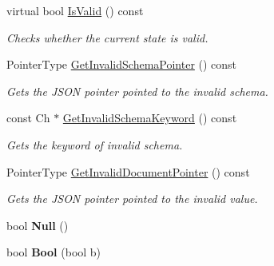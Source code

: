 \begin{DoxyCompactItemize}
virtual bool \hyperlink{classGenericSchemaValidator_a8ebda4da3d8b1fc41e57f15dd62e8f19}{Is\+Valid} () const
\begin{DoxyCompactList}\small\item\em Checks whether the current state is valid. \end{DoxyCompactList}\item 
\mbox{\label{classGenericSchemaValidator_a5b8f2d5c466b2a362e2e4c3bcfbfc5a8}} 
Pointer\+Type \hyperlink{classGenericSchemaValidator_a5b8f2d5c466b2a362e2e4c3bcfbfc5a8}{Get\+Invalid\+Schema\+Pointer} () const
\begin{DoxyCompactList}\small\item\em Gets the J\+S\+ON pointer pointed to the invalid schema. \end{DoxyCompactList}\item 
\mbox{\label{classGenericSchemaValidator_ab71ec18e5a013e5153a10b312a4f03bc}} 
const Ch $\ast$ \hyperlink{classGenericSchemaValidator_ab71ec18e5a013e5153a10b312a4f03bc}{Get\+Invalid\+Schema\+Keyword} () const
\begin{DoxyCompactList}\small\item\em Gets the keyword of invalid schema. \end{DoxyCompactList}\item 
\mbox{\label{classGenericSchemaValidator_ac10a88c4dc138bbdbe2afd041658a3b0}} 
Pointer\+Type \hyperlink{classGenericSchemaValidator_ac10a88c4dc138bbdbe2afd041658a3b0}{Get\+Invalid\+Document\+Pointer} () const
\begin{DoxyCompactList}\small\item\em Gets the J\+S\+ON pointer pointed to the invalid value. \end{DoxyCompactList}\item 
\mbox{\label{classGenericSchemaValidator_a7137af73e934f50c66cbb8a9aa802ea6}} 
bool {\bfseries Null} ()
\item 
\mbox{\label{classGenericSchemaValidator_aa25fa7456f2f308a105e400f01a4afde}} 
bool {\bfseries Bool} (bool b)
\item 
\mbox{\label{classGenericSchemaValidator_ad823c29990225661a4df69d34647b659}} 

\end{DoxyCompactItemize}
